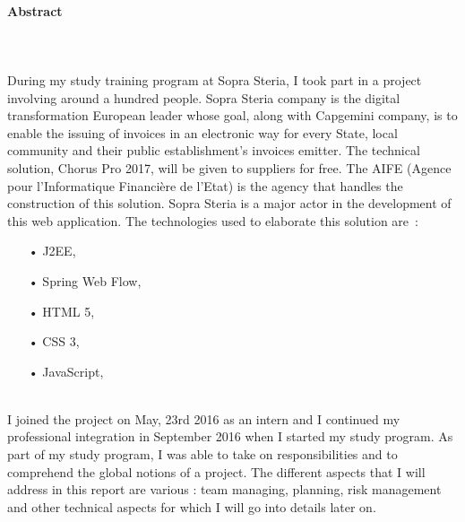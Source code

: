 \documentclass[12pt,a4paper]{article}
\begin{document}
\paragraph{Abstract}
~~\\\\
During my study training program at Sopra Steria, I took part in a project involving around a hundred people. Sopra Steria company is the digital transformation European leader whose goal, along with Capgemini company, is to enable the issuing of invoices in an electronic way for every State, local community and their public establishment’s invoices emitter. The technical solution, Chorus Pro 2017, will be given to suppliers for free. The AIFE (Agence pour l’Informatique Financière de l’Etat) is the agency that handles the construction of this solution. Sopra Steria is a major actor in the development of this web application. The technologies used to elaborate this solution are~:\\
\begin{itemize}
\item[•] \gls{J2EE},
\item[•] Spring Web Flow,
\item[•] HTML 5,
\item[•] CSS 3,
\item[•] JavaScript,
\end{itemize}
~~\\
 I joined the project on May, 23rd 2016 as an intern and I continued my professional integration in September 2016 when I started my study program. As part of my study program, I was able to take on responsibilities and to comprehend the global notions of a project. The different aspects that I will address in this report are various : team managing, planning, risk management and other technical aspects for which I will go into details later on. 
\newpage
\renewcommand{\contentsname}{Table des matières}
\tableofcontents
\newpage
\end{document}
